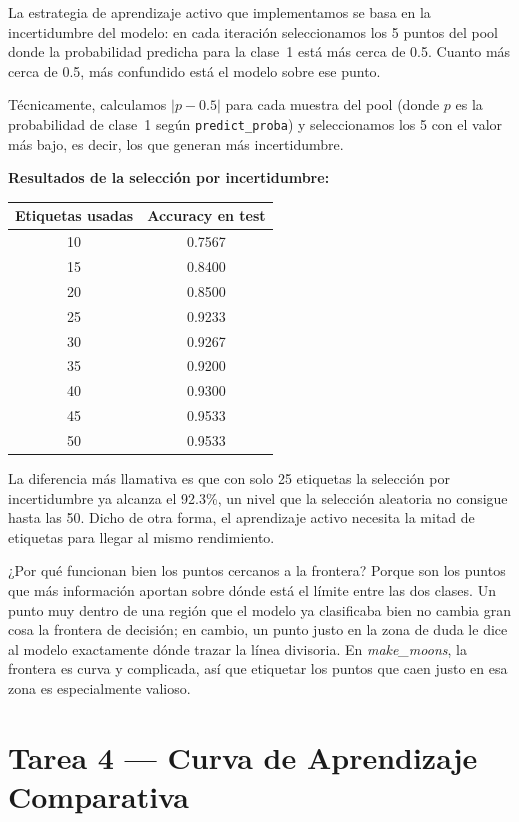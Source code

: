 \documentclass[../../__memoria.tex]{subfiles}
\begin{document}
La estrategia de aprendizaje activo que implementamos se basa en la incertidumbre del modelo: en cada iteración seleccionamos los 5 puntos del pool donde la probabilidad predicha para la clase~1 está más cerca de 0.5. Cuanto más cerca de 0.5, más confundido está el modelo sobre ese punto.

Técnicamente, calculamos $|p - 0.5|$ para cada muestra del pool (donde $p$ es la probabilidad de clase~1 según \texttt{predict\_proba}) y seleccionamos los 5 con el valor más bajo, es decir, los que generan más incertidumbre.

\textbf{Resultados de la selección por incertidumbre:}

\begin{center}
\begin{tabular}{cc}
\toprule
\textbf{Etiquetas usadas} & \textbf{Accuracy en test} \\
\midrule
10  & 0.7567 \\
15  & 0.8400 \\
20  & 0.8500 \\
25  & 0.9233 \\
30  & 0.9267 \\
35  & 0.9200 \\
40  & 0.9300 \\
45  & 0.9533 \\
50  & 0.9533 \\
\bottomrule
\end{tabular}
\end{center}

La diferencia más llamativa es que con solo 25 etiquetas la selección por incertidumbre ya alcanza el 92.3\%, un nivel que la selección aleatoria no consigue hasta las 50. Dicho de otra forma, el aprendizaje activo necesita la mitad de etiquetas para llegar al mismo rendimiento.

¿Por qué funcionan bien los puntos cercanos a la frontera? Porque son los puntos que más información aportan sobre dónde está el límite entre las dos clases. Un punto muy dentro de una región que el modelo ya clasificaba bien no cambia gran cosa la frontera de decisión; en cambio, un punto justo en la zona de duda le dice al modelo exactamente dónde trazar la línea divisoria. En \textit{make\_moons}, la frontera es curva y complicada, así que etiquetar los puntos que caen justo en esa zona es especialmente valioso.

\section[Tarea 4: Curva de Aprendizaje]{Tarea 4 --- Curva de Aprendizaje Comparativa}
\end{document}

